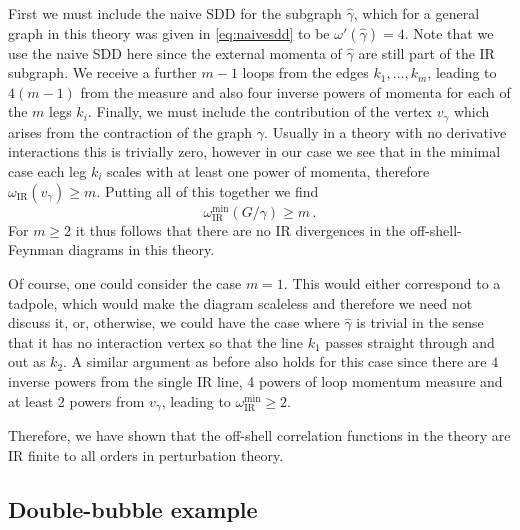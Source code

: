 \documentclass[a4paper,11pt]{article}
\begin{document}
First we must include the naive SDD for the subgraph $\hat{\gamma}$, which for a general graph in this theory was given in \cref{eq:naivesdd} to be ${\omega}'\left( \hat{\gamma} \right) = 4$. Note that we use the naive SDD here since the external momenta of $\hat \gamma$ are still part of the IR subgraph. We receive a further $m-1$ loops from the edges $k_1,\dots,k_m$, leading to $4(m-1)$ from the measure and also four inverse powers of momenta for each of the $m$ legs $k_i$. Finally, we must include the contribution of the vertex $v_\gamma$ which arises from the contraction of the graph $\gamma$. Usually in a theory with no derivative interactions this is trivially zero, however in our case we see that in the minimal case each leg $k_i$ scales with at least one power of momenta, therefore $\omega_{\mathrm{IR}}\left(v_{\gamma} \right) \geq m$. Putting all of this together we find 
\begin{equation}\label{eq:IRfinite}
   {\omega}_{\mathrm{IR}}^{\mathrm{min}}\left(  G/\gamma \right) \geq m \,.
\end{equation}
For $m \geq 2$ it thus follows that there are no IR divergences in the off-shell-Feynman diagrams in this theory.

Of course, one could consider the case $m=1$. This would either correspond to a tadpole, which would make the diagram scaleless and therefore we need not discuss it, or, otherwise, we could have the case where $\hat\gamma$ is trivial in the sense that it has no interaction vertex so that the line $k_1$ passes straight through and out as $k_2$. A similar argument as before also holds for this case since there are $4$ inverse powers from the single IR line, 4 powers of loop momentum measure and at least 2 powers from $v_\gamma$, leading to ${\omega}_{\mathrm{IR}}^{\mathrm{min}} \ge 2$.

Therefore, we have shown that the off-shell correlation functions in the theory are IR finite to all orders in perturbation theory.

\subsection{Double-bubble example}
\end{document}
